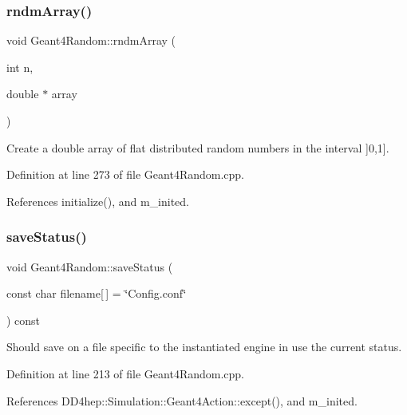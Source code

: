\subsubsection{\texorpdfstring{rndm\+Array()}{rndmArray()}\hspace{0.1cm}{\footnotesize\ttfamily [2/2]}}
{\footnotesize\ttfamily void Geant4\+Random\+::rndm\+Array (\begin{DoxyParamCaption}\item[{int}]{n,  }\item[{double $\ast$}]{array }\end{DoxyParamCaption})}



Create a double array of flat distributed random numbers in the interval \mbox{]}0,1\mbox{]}. 



Definition at line 273 of file Geant4\+Random.\+cpp.



References initialize(), and m\+\_\+inited.

\hypertarget{class_d_d4hep_1_1_simulation_1_1_geant4_random_aba1523a92243a5abcbd41f55041c120b}{}\label{class_d_d4hep_1_1_simulation_1_1_geant4_random_aba1523a92243a5abcbd41f55041c120b} 
\subsubsection{\texorpdfstring{save\+Status()}{saveStatus()}}
{\footnotesize\ttfamily void Geant4\+Random\+::save\+Status (\begin{DoxyParamCaption}\item[{const char}]{filename\mbox{[}$\,$\mbox{]} = {\ttfamily \char`\"{}Config.conf\char`\"{}} }\end{DoxyParamCaption}) const\hspace{0.3cm}{\ttfamily [virtual]}}



Should save on a file specific to the instantiated engine in use the current status. 



Definition at line 213 of file Geant4\+Random.\+cpp.



References D\+D4hep\+::\+Simulation\+::\+Geant4\+Action\+::except(), and m\+\_\+inited.

